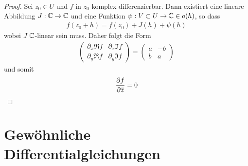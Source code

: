 \documentclass[ngerman]{report}
\begin{document}
\begin{proof}
    Sei $z_0\in U$ und $f$ in $z_0$ komplex differenzierbar. Dann existiert eine lineare Abbildung $J:\C\to\C$ und eine Funktion $\psi:V\subset U\to \C\in o(h)$, so dass 
    \begin{align*}
        f(z_0+h) = f(z_0) + J(h) + \psi(h)
    \end{align*}
    wobei $J$ $\C$-linear sein muss. Daher folgt die Form
    \begin{align*}
        \begin{pmatrix}
            \partial_x \Re f & \partial_x \Im f\\
            \partial_y \Re f & \partial_y \Im f
        \end{pmatrix} = \begin{pmatrix}
            a & -b\\
            b & a
        \end{pmatrix}
    \end{align*}
    und somit
    \begin{align*}
        \pder[f]{\overline{z}} = 0
    \end{align*}
\end{proof}

\chapter{Gewöhnliche Differentialgleichungen}
\end{document}
